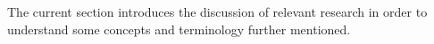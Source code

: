 \label{sec:background}

The current section introduces the discussion of relevant research in order to understand some concepts and terminology further mentioned.




